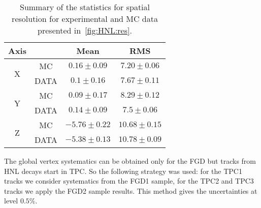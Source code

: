 \documentclass[../main.tex]{subfiles}
\begin{document}
\begin{table}[!ht]
\begin{center}
\begin{tabular}{|c|c|c|c|}
    \hline
    Axis & & Mean & RMS \\
    \hline
    \multirow{2}{*}{X} & MC & $0.16 \pm 0.09$ & $7.20\pm0.06$\\

    & DATA & $0.1\pm0.16$ & $7.67\pm0.11$ \\
    \hline
    \multirow{2}{*}{Y} & MC & $0.09 \pm 0.17$ & $8.29 \pm 0.12$\\

    & DATA & $0.14 \pm 0.09$ & $7.5 \pm 0.06$ \\
    \hline
    \multirow{2}{*}{Z} & MC & $-5.76 \pm 0.22$ & $10.68 \pm 0.15$\\

    & DATA & $-5.38 \pm 0.13$ & $10.78 \pm 0.09$ \\
    \hline
\end{tabular}
\caption{Summary of the statistics for spatial resolution for experimental and MC data presented in~\autoref{fig:HNL:res}.}
\label{tbl:HNL:res}
\end{center}
\end{table}

The global vertex systematics can be obtained only for the FGD but tracks from HNL decays start in TPC. So the following strategy was used: for the TPC1 tracks we consider systematics from the FGD1 sample, for the TPC2 and TPC3 tracks we apply the FGD2 sample results. This method gives the uncertainties at level $0.5\%$.
\end{document}
